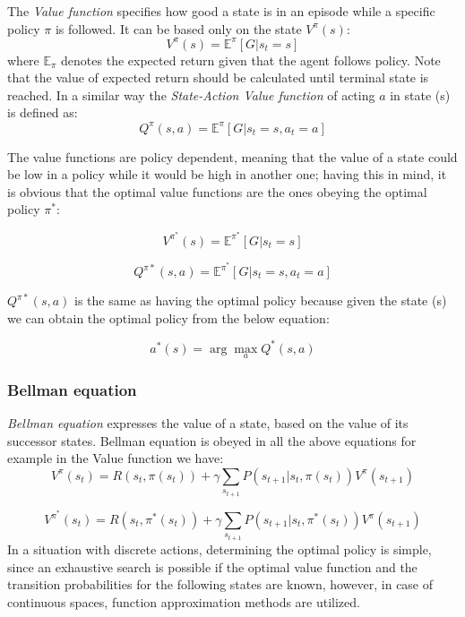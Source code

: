 The \textit{Value function} specifies how good a state is in an episode while a specific policy $\pi$ is followed. It can be based only on the state $V^\pi(s)$:
\begin{equation}
	\displaystyle V^\pi(s)= \mathbb{E}^{\pi}[G| s_t = s]
\end{equation}
where $\displaystyle \mathbb{E}_\pi$ denotes the expected return given that the agent follows policy. Note that the value of expected return should be calculated until terminal state is reached.
In a similar way the \textit{State-Action Value function} of acting $a$ in state (s) is defined as:
\begin{equation}
	\displaystyle Q^\pi(s,a)= \mathbb{E}^{\pi}[G|s_t=s,a_t=a]
\end{equation}

The value functions are policy dependent, meaning that the value of a state could be low in a policy while it would be high in another one; having this in mind, it is obvious that the optimal value functions are the ones obeying the optimal policy $\pi^*$:

\begin{equation}
	\displaystyle V^{\pi^*}(s)= \mathbb{E}^{\pi^*}[G| s_t = s]
\end{equation}

\begin{equation}
	\displaystyle Q^{\pi*}(s,a)= \mathbb{E}^{\pi^*}[G|s_t=s,a_t=a]
\end{equation}

$Q^{\pi*}(s,a)$ is the same as having the optimal policy because given the state (s) we can obtain the optimal policy from the below equation:

\begin{equation}
	a^*(s) =  \arg \max_a Q^*(s,a)
\end{equation}
\subsubsection{Bellman equation}
\textit{Bellman equation} expresses the value of a state, based on the value of its successor states. Bellman equation is obeyed in all the above equations for example in the Value function we have: 
\begin{equation}
	V^\pi(s_t) = R(s_t,\pi(s_t)) + \gamma \sum_{s_{t+1}} P(s_{t+1}|s_t,\pi(s_t)) V^\pi(s_{t+1}) 
\end{equation}

\begin{equation}
	V^{\pi^*}(s_t) = R(s_t,\pi^*(s_t)) + \gamma \sum_{s_{t+1}} P(s_{t+1}|s_t,\pi^*(s_t)) V^\pi(s_{t+1}) 
\end{equation}
In a situation with discrete actions, determining the optimal policy is simple, since an exhaustive search is possible if the optimal value function and the transition probabilities for the following states are known, however, in case of continuous spaces, function approximation methods are utilized.\\

